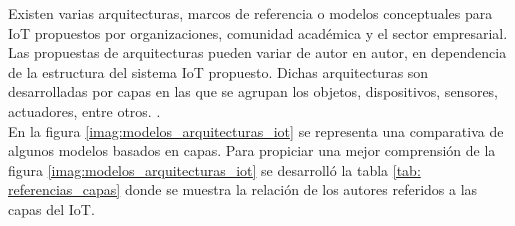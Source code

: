     Existen varias arquitecturas, marcos de referencia o modelos conceptuales para IoT propuestos por organizaciones, comunidad académica y el sector empresarial. Las propuestas de arquitecturas pueden variar de autor en autor, en dependencia de la estructura del sistema IoT propuesto. Dichas arquitecturas son desarrolladas por capas en las que se agrupan los objetos, dispositivos, sensores, actuadores, entre otros. \cite{internetOfThingsStateOfTheArt} \cite{capasIoTciberseguridad}.\\

    En la figura \ref{imag:modelos_arquitecturas_iot} se representa una comparativa de algunos modelos basados en capas. Para propiciar una mejor comprensión de la figura \ref{imag:modelos_arquitecturas_iot} se desarrolló la tabla \ref{tab: referencias_capas} donde se muestra la relación de los autores referidos a las capas del IoT.


